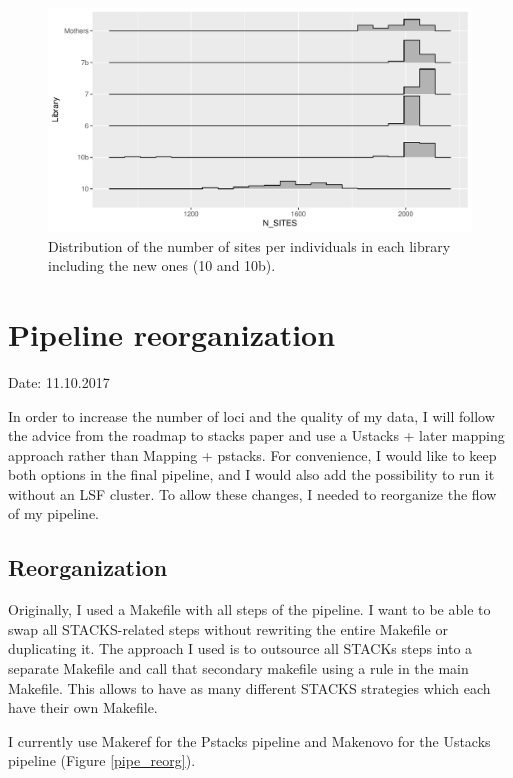 \documentclass[10pt,a4paper]{report}
\begin{document}
\begin{figure}[h]
	\begin{center}
		\includegraphics[width=\textwidth]{add_samples/library_sites.pdf}
		\caption{Distribution of the number of sites per individuals in each library including the new ones (10 and 10b).}
		\label{n_sites_add}
	\end{center}
\end{figure}
\FloatBarrier

\chapter{Pipeline reorganization}
Date: 11.10.2017

In order to increase the number of loci and the quality of my data, I will follow the advice from the roadmap to stacks paper and use a Ustacks + later mapping approach rather than Mapping + pstacks. For convenience, I would like to keep both options in the final pipeline, and I would also add the possibility to run it without an LSF cluster. To allow these changes, I needed to reorganize the flow of my pipeline.

\section{Reorganization}
Originally, I used a Makefile with all steps of the pipeline. I want to be able to swap all STACKS-related steps without rewriting the entire Makefile or duplicating it. The approach I used is to outsource all STACKs steps into a separate Makefile and call that secondary makefile using a rule in the main Makefile. This allows to have as many different STACKS strategies which each have their own Makefile.

I currently use Makeref for the Pstacks pipeline and Makenovo for the Ustacks pipeline (Figure \ref{pipe_reorg}).
\end{document}
